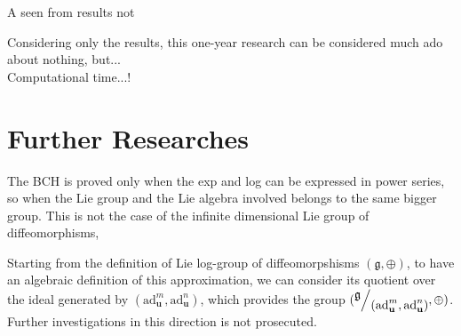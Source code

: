 

A seen from results not 


Considering only the results, this one-year research can be considered much ado about nothing, but...\\
Computational time...!

\section{Further Researches}\label{se:further_research}




The BCH is proved only when the exp and log can be expressed in power series, so when the Lie group and the Lie algebra involved belongs to the same bigger group. This is not the case of the infinite dimensional Lie group of diffeomorphisms,




Starting from the definition of Lie log-group of diffeomorpshisms $(\mathfrak{g} , \oplus)$, to have an algebraic definition of this approximation, we can consider its quotient over the ideal generated by $(\text{ad}_{\mathbf{u}}^{m}, \text{ad}_{\mathbf{u}}^{n})$, which provides the group $(\quotient{\mathfrak{g}}{(\text{ad}_{\mathbf{u}}^{m}, \text{ad}_{\mathbf{u}}^{n})}, \oplus)$. Further investigations in this direction is not prosecuted.






